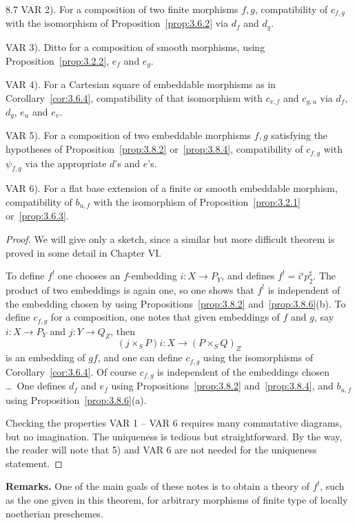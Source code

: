 \begin{booktheorem}{8.7}
VAR 2). For a composition of two finite morphisms $f,g$, compatibility of $c_{f,g}$ with the isomorphism of Proposition~\ref{prop:3.6.2} via $d_f$ and $d_g$.

VAR 3). Ditto for a composition of smooth morphisms, using Proposition~\ref{prop:3.2.2}, $e_f$ and $e_g$.

VAR 4). For a Cartesian square of embeddable morphisms as in Corollary~\ref{cor:3.6.4}, compatibility of that isomorphism with $c_{v,f}$ and $c_{g,u}$ via $d_f$, $d_g$, $e_u$ and $e_v$.

VAR 5). For a composition of two embeddable morphisms $f,g$ satisfying the hypotheses of Proposition~\ref{prop:3.8.2} or~\ref{prop:3.8.4}, compatibility of $c_{f,g}$ with $\psi_{f,g}$ via the appropriate $d$'s and $e$'s.

VAR 6). For a flat base extension of a finite or smooth embeddable morphism, compatibility of $b_{u,f}$ with the isomorphism of Proposition~\ref{prop:3.2.1} or~\ref{prop:3.6.3}.
\end{booktheorem}

\begin{proof}
We will give only a sketch, since a similar but more difficult theorem is proved in some detail in Chapter VI.

To define $f^!$ one chooses an $f$-embedding $i\colon X\to P_Y$, and defines $f^!=i^{\flat}p_2^{\sharp}$. The product of two embeddings is again one, so one shows that $f^!$ is independent of the embedding chosen by using Propositions~\ref{prop:3.8.2} and~\ref{prop:3.8.6}(b). To define $c_{f,g}$ for a composition, one notes that given embeddings of $f$ and $g$, say $i\colon X\to P_Y$ and $j\colon Y\to Q_Z$, then
\[
(j\times_S P)i\colon X \longrightarrow (P\times_S Q)_Z
\]
is an embedding of $gf$, and one can define $c_{f,g}$ using the isomorphisms of Corollary~\ref{cor:3.6.4}. Of course $c_{f,g}$ is independent of the embeddings chosen \dots\ One defines $d_f$ and $e_f$ using Propositions~\ref{prop:3.8.2} and~\ref{prop:3.8.4}, and $b_{u,f}$ using Proposition~\ref{prop:3.8.6}(a).

Checking the properties VAR 1 -- VAR 6 requires many commutative diagrams, but no imagination. The uniqueness is tedious but straightforward. By the way, the reader will note that 5) and VAR 6 are not needed for the uniqueness statement.
\end{proof}

\textbf{Remarks.}
One of the main goals of these notes is to obtain a theory of $f^!$, such as the one given in this theorem, for arbitrary morphisms of finite type of locally noetherian preschemes.

